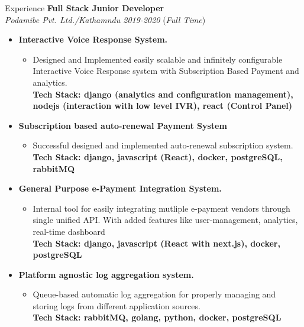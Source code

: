 \documentclass{resume} %
\begin{document}
\begin{rSection}{Experience}
    \large{{\bf Full Stack Junior Developer}}
    \\ \small{\textit{Podamibe Pvt. Ltd./Kathamndu 2019-2020}} (\small{\textit{Full Time}})
    \begin{itemize}
        \item \textbf{Interactive Voice Response System.}
              \begin{itemize}
                  \item Designed and Implemented easily scalable and infinitely configurable Interactive Voice Response system
                        with Subscription Based Payment and analytics.
                        \\ \footnotesize{\textbf{Tech Stack: django (analytics and configuration management), nodejs (interaction with low level IVR), react (Control Panel)}}
              \end{itemize}

        \item \textbf{Subscription based auto-renewal Payment System}
              \begin{itemize}
                  \item Successful designed and implemented auto-renewal subscription system.
                        \\ \footnotesize{\textbf{Tech Stack: django, javascript (React), docker, postgreSQL, rabbitMQ}}
              \end{itemize}

        \item \textbf{General Purpose e-Payment Integration System.}
              \begin{itemize}
                  \item Internal tool for easily integrating mutliple e-payment vendors through single unified API. With added features like user-management, analytics, real-time dashboard
                        \\ \footnotesize{\textbf{Tech Stack: django, javascript (React with next.js), docker, postgreSQL}}
              \end{itemize}

        \item \textbf{Platform agnostic log aggregation system.}
              \begin{itemize}
                  \item Queue-based automatic log aggregation for properly managing and storing
                        logs from different application sources.
                        \\ \footnotesize{\textbf{Tech Stack: rabbitMQ, golang, python, docker, postgreSQL}}
              \end{itemize}
    \end{itemize}




\end{rSection}
\end{document}
